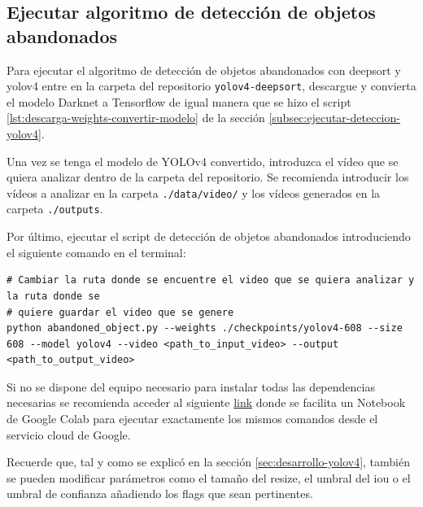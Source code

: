 \subsection{Ejecutar algoritmo de detección de objetos abandonados}
\label{subsec:ejecutar-deteccion-abandoned-object}

Para ejecutar el algoritmo de detección de objetos abandonados con \gls{deepsort} y \gls{yolov4} entre en la carpeta del repositorio \texttt{yolov4-deepsort}, descargue y convierta el modelo Darknet a Tensorflow de igual manera que se hizo el script \ref{lst:descarga-weights-convertir-modelo} de la sección \ref{subsec:ejecutar-deteccion-yolov4}.

Una vez se tenga el modelo de YOLOv4 convertido, introduzca el vídeo que se quiera analizar dentro de la carpeta del repositorio. Se recomienda introducir los vídeos a analizar en la carpeta \texttt{./data/video/} y los vídeos generados en la carpeta \texttt{./outputs}.

Por último, ejecutar el script de detección de objetos abandonados introduciendo el siguiente comando en el terminal:

\vspace{0.5cm}
\begin{lstlisting}[language=iPython,caption=Ejecutar script detección de objetos abandonados con YOLOv4 y Deep SORT,captionpos=b,label={lst:ejecutar-yolov4-abandoned-object}]
# Cambiar la ruta donde se encuentre el video que se quiera analizar y la ruta donde se
# quiere guardar el video que se genere
python abandoned_object.py --weights ./checkpoints/yolov4-608 --size 608 --model yolov4 --video <path_to_input_video> --output <path_to_output_video>
\end{lstlisting}

Si no se dispone del equipo necesario para instalar todas las dependencias necesarias se recomienda acceder al siguiente \href{https://colab.research.google.com/drive/18vL9LH8e9VaimA9LzBD35Cn4AOm6C17I?usp=sharing}{link} donde se facilita un Notebook de Google Colab para ejecutar exactamente los mismos comandos desde el servicio cloud de Google.

Recuerde que, tal y como se explicó en la sección \ref{sec:desarrollo-yolov4}, también se pueden modificar parámetros como el tamaño del resize, el umbral del \gls{iou} o el umbral de confianza añadiendo los flags que sean pertinentes.